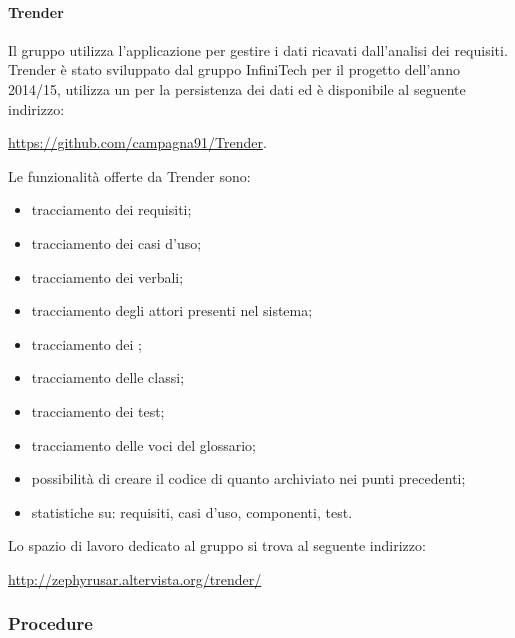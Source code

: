 				\paragraph{Trender}\label{sec:trender}
				Il gruppo utilizza l'applicazione  per gestire i dati ricavati dall'analisi dei requisiti. Trender è stato sviluppato dal gruppo InfiniTech per il progetto dell'anno 2014/15, utilizza un   per la persistenza dei dati ed è disponibile al seguente indirizzo:
				\begin{center}
					\url{https://github.com/campagna91/Trender}.
				\end{center}
				Le funzionalità offerte da Trender sono:
				\begin{itemize}
					\item tracciamento dei requisiti;
					\item tracciamento dei casi d’uso;
					\item tracciamento dei verbali;
					\item tracciamento degli attori presenti nel sistema;
					\item tracciamento dei ;
					\item tracciamento delle classi;
					\item tracciamento dei test;
					\item tracciamento delle voci del glossario;
					\item possibilità di creare il codice  di quanto archiviato nei punti precedenti;
					\item statistiche su: requisiti, casi d'uso, componenti, test.
				\end{itemize}
				Lo spazio di lavoro dedicato al gruppo si trova al seguente indirizzo:
				\begin{center}
					\url{http://zephyrusar.altervista.org/trender/}
				\end{center}

        \subsubsection{Procedure}

